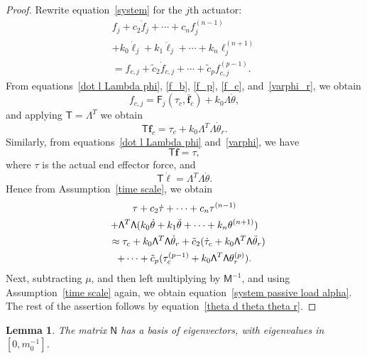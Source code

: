 \documentclass[oneside,twocolumn,reqno]{amsart}
\newtheorem{lemma}{Lemma}
\begin{document}
\begin{proof}  Rewrite equation~\eqref{system} for the $j$th actuator:
\begin{multline}
\label{system for jth}
f_j + c_2 \dot f_j + \cdots + c_n f_j^{(n-1)} \\
+ k_0 \dot \ell_j + k_1 \ddot \ell_j + \cdots + k_n \ell_j^{(n+1)} \\
= f_{c,j} + \tilde c_2 \dot f_{c,j} + \cdots + \tilde c_p f_{c,j}^{(p-1)}.
\end{multline}
From equations~\eqref{dot l Lambda phi}, \eqref{f_b}, \eqref{f_p}, \eqref{f_c}, and~\eqref{varphi_r}, we obtain
\begin{equation}
f_{c,j} = \mathsf F_j(\tau_c, \bar{\bm f}_c) + k_0 \Lambda \dot\theta,
\end{equation}
and applying $\mathsf T = \mathsf \Lambda^T$ we obtain
\begin{equation}
\mathsf T \bm f_c = \tau_c + k_0 \mathsf \Lambda^T \mathsf \Lambda \dot\theta_r .
\end{equation}
Similarly, from equations~\eqref{dot l Lambda phi} and~\eqref{varphi}, we have
\begin{equation}
\mathsf T \bm f = \tau,
\end{equation}
where $\tau$ is the actual end effector force, and
\begin{equation}
\mathsf T \dot{\bm \ell} = \mathsf \Lambda^T \mathsf \Lambda \dot\theta .
\end{equation}
Hence from Assumption~\ref{time scale}, we obtain
\begin{multline}
\tau + c_2 \dot \tau + \cdots + c_n \tau^{(n-1)} \\
+ \mathsf\Lambda^T \mathsf\Lambda (k_0 \dot\theta + k_1 \ddot\theta + \cdots + k_n \theta^{(n+1)}) \\
\shoveleft{\approx  \tau_c + k_0 \mathsf\Lambda^T \mathsf\Lambda \dot\theta_r
+ \tilde c_2 (\dot\tau_c + k_0 \mathsf\Lambda^T \mathsf\Lambda \ddot\theta_r)} \\
+ \cdots + \tilde c_p (\tau_c^{(p-1)} + k_0 \mathsf\Lambda^T \mathsf\Lambda \theta_r^{(p)}) .
\end{multline}
Next, subtracting $\mu$, and then left multiplying by $\mathsf M^{-1}$, and using Assumption~\ref{time scale} again, we obtain equation~\eqref{system passive load alpha}.  The rest of the assertion follows by equation~\eqref{theta d theta theta r}.\end{proof}

\begin{lemma}
\label{eig}
The matrix $\mathsf N$ has a basis of eigenvectors, with eigenvalues in $[0,m_0^{-1}]$.
\end{lemma}
\end{document}
